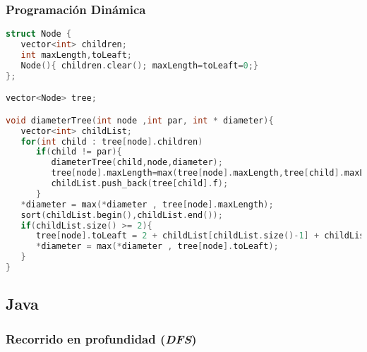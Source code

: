 \subsubsection{Programación Dinámica}
\begin{lstlisting}[language=C++]
struct Node {
   vector<int> children;
   int maxLength,toLeaft;
   Node(){ children.clear(); maxLength=toLeaft=0;}
};

vector<Node> tree;

void diameterTree(int node ,int par, int * diameter){
   vector<int> childList;
   for(int child : tree[node].children)
      if(child != par){
         diameterTree(child,node,diameter);
         tree[node].maxLength=max(tree[node].maxLength,tree[child].maxLength+1);
         childList.push_back(tree[child].f);
	  }
   *diameter = max(*diameter , tree[node].maxLength);
   sort(childList.begin(),childList.end());
   if(childList.size() >= 2){
      tree[node].toLeaft = 2 + childList[childList.size()-1] + childList[childList.size()-2];
      *diameter = max(*diameter , tree[node].toLeaft);
   }
}
\end{lstlisting}

\subsection{Java}

\subsubsection{Recorrido en profundidad (\emph{DFS})}

